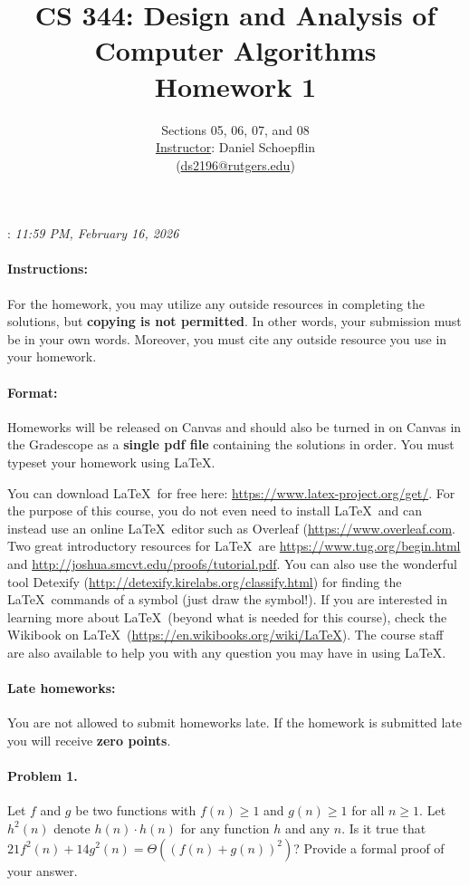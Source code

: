 \documentclass[10pt]{article}
\title{CS 344: Design and Analysis of Computer Algorithms\\
Homework 1}
\author{Sections 05, 06, 07, and 08\\
\underline{Instructor}: Daniel Schoepflin\\
(\url{ds2196@rutgers.edu})}
\date{}
\begin{document}
\maketitle
{: {\it 11:59 PM, February 16, 2026}


}

\paragraph{Instructions:} For the homework, you may utilize any outside resources in completing the solutions, but \textbf{copying is not permitted}.  In other words, your submission must be in your own words.  Moreover, you must cite any outside resource you use in your homework.

\paragraph{Format:} Homeworks will be released on Canvas and should also be turned in on Canvas in the Gradescope as a {\bf single pdf file} containing the solutions in order. You must typeset your homework using 
\LaTeX.   

You can download \LaTeX\ for free here: \url{https://www.latex-project.org/get/}. For the purpose of this course, you do not even need to install \LaTeX\ and 
can instead use an online \LaTeX\ editor such as Overleaf (\url{https://www.overleaf.com}.
Two great introductory resources for  \LaTeX\ are \url{https://www.tug.org/begin.html}  and \url{http://joshua.smcvt.edu/proofs/tutorial.pdf}. 
You can also use the wonderful tool Detexify (\url{http://detexify.kirelabs.org/classify.html})  for finding the
 \LaTeX\ commands of a symbol (just draw the symbol!).  
If you are interested in learning more about \LaTeX\ (beyond what is needed for this course), check the Wikibook on \LaTeX\ (\url{https://en.wikibooks.org/wiki/LaTeX}). 
The course staff are also available to help you with any question you may have in using \LaTeX.



\paragraph{Late homeworks:} You are not allowed to submit homeworks late.  If the homework is submitted late you will receive {\bf zero points}. 
\clearpage


\paragraph{Problem 1.} Let $f$ and $g$ be two functions with $f(n) \geq 1$ and $g(n) \geq 1$ for all $n \geq 1$.  Let $h^2(n)$ denote $h(n)\cdot h(n)$ for any function $h$ and any $n$.  Is it true that $21f^2(n) + 14g^2(n) = \Theta((f(n) +g(n))^2)$?  Provide a formal proof of your answer.
\end{document}
